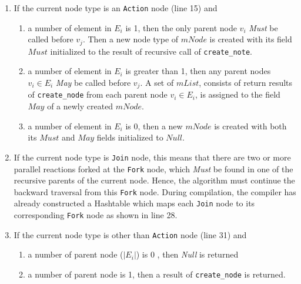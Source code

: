 \begin{enumerate}

	\item If the current node type is an \texttt{Action} node (line 15)
		and

		\begin{enumerate}

			\item a number of element in $E_i$ is 1, then the only parent node
				$v_i$ \textit{Must} be called before $v_j$. Then a new node type
				of $mNode$ is created with its field $Must$ initialized to the
				result of recursive call of \texttt{create\_note}.

			\item a number of element in $E_i$ is greater than 1, then any
				parent nodes $v_i \in E_i$ \textit{May} be called before $v_j$.
				A set of $mList$, consists of return results of
				\texttt{create\_node} from each parent node $v_i \in E_i$, is
				assigned to the field $May$ of a newly created $mNode$. 

			\item a number of element in $E_i$ is 0, then a new $mNode$ is
				created with both its $Must$ and $May$ fields initialized to
				$Null$.

		\end{enumerate}

	\item If the current node type is \texttt{Join} node, this means that
		there are two or more parallel reactions forked at the \texttt{Fork}
		node, which \textit{Must} be found in one of the recursive parents
		of the current node. Hence, the algorithm must continue the backward
		traversal from this \texttt{Fork} node. During compilation, the
		compiler has already constructed a Hashtable which maps each
		\texttt{Join} node to its corresponding \texttt{Fork} node as shown
		in line 28. 

	\item If the current node type is other than \texttt{Action} node (line
		31) and

		\begin{enumerate}

			\item a number of parent node ($|E_i|$) is 0 , then \textit{Null}
				is returned

			\item a number of parent node is 1, then a result of
				\texttt{create\_node} is returned.

		\end{enumerate}

\end{enumerate}

